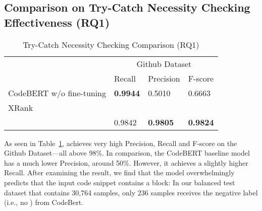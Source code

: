 \subsection{Comparison on Try-Catch Necessity Checking Effectiveness (RQ1)}

\begin{table}[t]%
  \caption{Try-Catch Necessity Checking Comparison (RQ1)}
  \vspace{-12pt}
  \small
	\begin{center}
		\renewcommand{\arraystretch}{1}
		\begin{tabular}{| p{3.05cm}<{\centering} | p{0.90cm}<{\centering} | p{0.95cm}<{\centering}| p{0.90cm}<{\centering}|}
		  \hline
			\multirow{2}{*}{} & \multicolumn{3}{c|}{Github Dataset} \\
			\cline{2-4}
			  & Recall  & Precision & F-score \\
			\hline
			CodeBERT w/o fine-tuning &  \textbf{0.9944} & 0.5010  & 0.6663\\
			\hline
			XRank &  &  & \\
			\hline
			\tool   & 0.9842  &  \textbf{0.9805} & \textbf{0.9824}\\
			\hline
		\end{tabular}
		\label{tab:xblock}
	\end{center}
\end{table}






As seen in Table~\ref{tab:xblock}, {\tool} achieves very high
Precision, Recall and F-score on the Github Dataset---all above
98\%. In comparison, the CodeBERT baseline model has a much lower
Precision, around 50\%.
However, it achieves a slightly higher Recall. After examining the
result, we find that the model overwhelmingly predicts that the input
code snippet contains a  block: In our balanced test
dataset that contains 30,764 samples, only 236 samples receives the
negative label (i.e., no ) from CodeBert.



